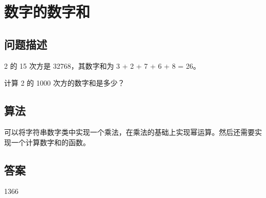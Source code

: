 \section{数字的数字和}\label{sec:problem16}
\subsection{问题描述}
\begin{tcolorbox}
2 的 15 次方是 32768，其数字和为 3 + 2 + 7 + 6 + 8 = 26。

计算 2 的 1000 次方的数字和是多少？
\end{tcolorbox}

\subsection{算法}
可以将字符串数字类中实现一个乘法，在乘法的基础上实现幂运算。然后还需要实现一个计算数字和的函数。

\subsection{答案}
1366
